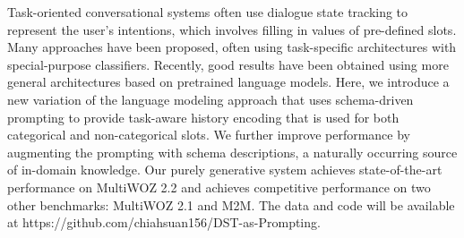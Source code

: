 Task-oriented conversational systems often use dialogue state tracking to represent the user's intentions, which involves filling in values of pre-defined slots. Many approaches have been proposed, often using task-specific architectures with special-purpose classifiers.  Recently, good results have been obtained using more general architectures based on pretrained language models. Here, we introduce a new variation of the language modeling approach that uses schema-driven prompting to provide task-aware history encoding that is used for both categorical and non-categorical slots. We further improve performance by augmenting the prompting with schema descriptions, a naturally occurring source of in-domain knowledge. Our purely generative system achieves state-of-the-art performance on MultiWOZ 2.2 and achieves competitive performance on two other benchmarks: MultiWOZ 2.1 and M2M. The data and code will be available at https://github.com/chiahsuan156/DST-as-Prompting.
